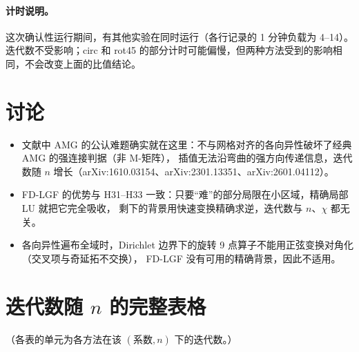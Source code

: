 \documentclass[11pt,a4paper]{ctexart}
\begin{document}
\paragraph{计时说明。}这次确认性运行期间，有其他实验在同时运行（各行记录的 1 分钟负载为 4--14）。
迭代数不受影响；circ 和 rot45 的部分计时可能偏慢，但两种方法受到的影响相同，不会改变上面的比值结论。

\section{讨论}
\begin{itemize}
\item 文献中 AMG 的公认难题确实就在这里：不与网格对齐的各向异性破坏了经典 AMG 的强连接判据（非 M-矩阵），
插值无法沿弯曲的强方向传递信息，迭代数随 $n$ 增长（arXiv:1610.03154、arXiv:2301.13351、arXiv:2601.04112）。
\item FD-LGF 的优势与 H31--H33 一致：只要“难”的部分局限在小区域，精确局部 LU 就把它完全吸收，
剩下的背景用快速变换精确求逆，迭代数与 $n$、$\chi$ 都无关。
\item 各向异性遍布全域时，Dirichlet 边界下的旋转 9 点算子不能用正弦变换对角化（交叉项与奇延拓不交换），
FD-LGF 没有可用的精确背景，因此不适用。
\end{itemize}

\appendix
\section{迭代数随 $n$ 的完整表格}
（各表的单元为各方法在该 $(\text{系数},n)$ 下的迭代数。）

\end{document}
